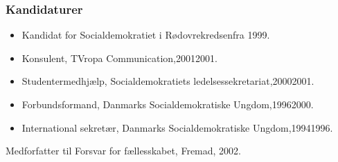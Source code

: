 \documentclass[11pt, a4paper]{awesome-cv}
\begin{document}
\begin{cvletter}
\subsubsection*{Kandidaturer}
\begin{itemize}
\item Kandidat for Socialdemokratiet i Rødovrekredsenfra 1999.
\end{itemize}
\begin{itemize}
\item Konsulent, TVropa Communication,20012001.
\item Studentermedhjælp, Socialdemokratiets ledelsessekretariat,20002001.
\item Forbundsformand, Danmarks Socialdemokratiske Ungdom,19962000.
\item International sekretær, Danmarks Socialdemokratiske Ungdom,19941996.
\end{itemize}
Medforfatter til Forsvar for fællesskabet, Fremad, 2002.

\end{cvletter}
\end{document}

